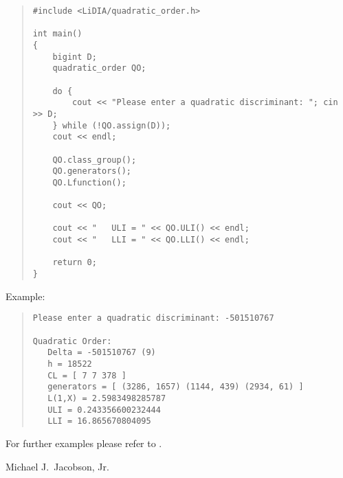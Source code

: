 



\EXAMPLES

\begin{quote}
\begin{verbatim}
#include <LiDIA/quadratic_order.h>

int main()
{
    bigint D;
    quadratic_order QO;

    do {
        cout << "Please enter a quadratic discriminant: "; cin >> D;
    } while (!QO.assign(D));
    cout << endl;

    QO.class_group();
    QO.generators();
    QO.Lfunction();

    cout << QO;

    cout << "   ULI = " << QO.ULI() << endl;
    cout << "   LLI = " << QO.LLI() << endl;

    return 0;
}
\end{verbatim}
\end{quote}

Example:
\begin{quote}
\begin{verbatim}
Please enter a quadratic discriminant: -501510767

Quadratic Order:
   Delta = -501510767 (9)
   h = 18522
   CL = [ 7 7 378 ]
   generators = [ (3286, 1657) (1144, 439) (2934, 61) ]
   L(1,X) = 2.5983498285787
   ULI = 0.243356600232444
   LLI = 16.865670804095
\end{verbatim}
\end{quote}

For further examples please refer to
.



\AUTHOR

Michael J.~Jacobson, Jr.

